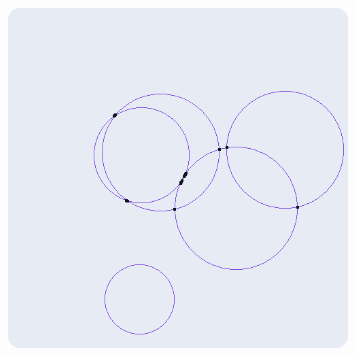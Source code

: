 \documentclass[a4paper]{article}
\begin{document}
\begin{center}
\includegraphics[width=9cm]{src/tarea2_4.png}
\end{center}
\end{document}
